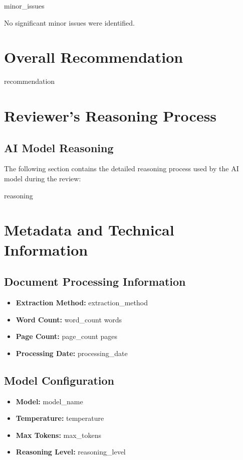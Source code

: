 \documentclass[11pt,letterpaper]{article}
\begin{document}
{%
{{ minor_issues }}
{%
No significant minor issues were identified.
{%

\section{Overall Recommendation}

\begin{recommendationbox}
{{ recommendation }}
\end{recommendationbox}

\section{Reviewer's Reasoning Process}

{%
\subsection{AI Model Reasoning}
The following section contains the detailed reasoning process used by the AI model during the review:

\begin{tcolorbox}[colback=gray!5!white,colframe=gray!75!black,title=Model Reasoning]
{{ reasoning }}
\end{tcolorbox}
{%

\section{Metadata and Technical Information}

\subsection{Document Processing Information}
\begin{itemize}
    \item \textbf{Extraction Method:} {{ extraction_method }}
    \item \textbf{Word Count:} {{ word_count }} words
    \item \textbf{Page Count:} {{ page_count }} pages
    \item \textbf{Processing Date:} {{ processing_date }}
\end{itemize}

\subsection{Model Configuration}
\begin{itemize}
    \item \textbf{Model:} {{ model_name }}
    \item \textbf{Temperature:} {{ temperature }}
    \item \textbf{Max Tokens:} {{ max_tokens }}
    \item \textbf{Reasoning Level:} {{ reasoning_level }}
\end{itemize}

}}}}}
\end{document}
